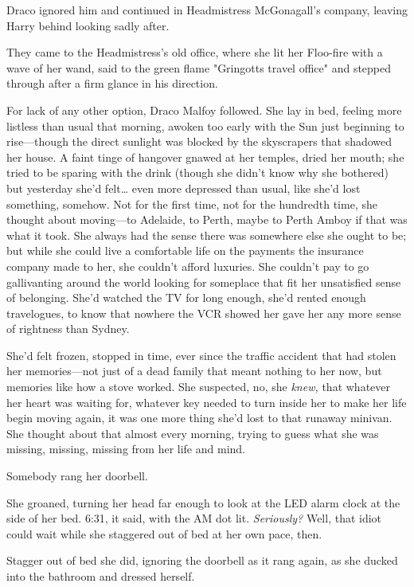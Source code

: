 Draco ignored him and continued in Headmistress McGonagall's company, leaving
Harry behind looking sadly after.

They came to the Headmistress's old office, where she lit her Floo-fire with a
wave of her wand, said to the green flame "Gringotts travel office" and stepped
through after a firm glance in his direction.

For lack of any other option, Draco Malfoy followed.
\sbreak
She lay in bed, feeling more listless than usual that morning, awoken too early
with the Sun just beginning to rise---though the direct sunlight was blocked by
the skyscrapers that shadowed her house. A faint tinge of hangover gnawed at
her temples, dried her mouth; she tried to be sparing with the drink (though
she didn't know why she bothered) but yesterday she'd felt{\ldots} even more
depressed than usual, like she'd lost something, somehow. Not for the first
time, not for the hundredth time, she thought about moving---to Adelaide, to
Perth, maybe to Perth Amboy if that was what it took. She always had the sense
there was somewhere else she ought to be; but while she could live a
comfortable life on the payments the insurance company made to her, she
couldn't afford luxuries. She couldn't pay to go gallivanting around the world
looking for someplace that fit her unsatisfied sense of belonging. She'd
watched the TV for long enough, she'd rented enough travelogues, to know that
nowhere the VCR showed her gave her any more sense of rightness than Sydney.

She'd felt frozen, stopped in time, ever since the traffic accident that had
stolen her memories---not just of a dead family that meant nothing to her now,
but memories like how a stove worked. She suspected, no, she \emph{knew,} that
whatever her heart was waiting for, whatever key needed to turn inside her to
make her life begin moving again, it was one more thing she'd lost to that
runaway minivan. She thought about that almost every morning, trying to guess
what she was missing, missing, missing from her life and mind.

Somebody rang her doorbell.

She groaned, turning her head far enough to look at the LED alarm clock at the
side of her bed. 6:31, it said, with the AM dot lit. \emph{Seriously?} Well,
that idiot could wait while she staggered out of bed at her own pace, then.

Stagger out of bed she did, ignoring the doorbell as it rang again, as she
ducked into the bathroom and dressed herself.

